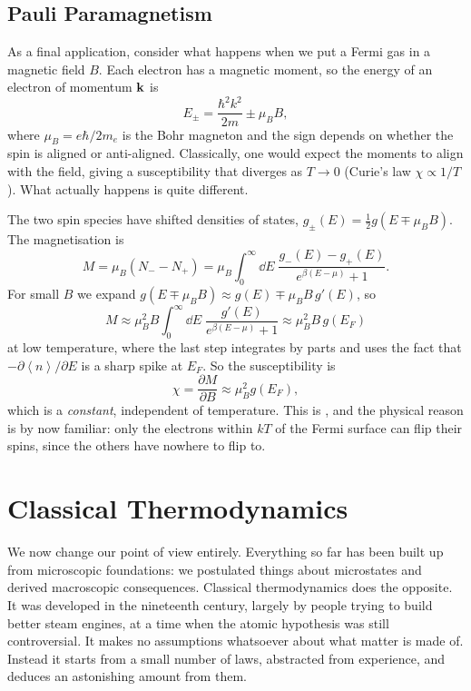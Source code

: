 \documentclass[a4paper]{scrartcl}
\newcommand{\avg}[1]{\left\langle #1 \right\rangle}
\begin{document}
\subsection{Pauli Paramagnetism}

As a final application, consider what happens when we put a Fermi gas in a magnetic field $B$. Each electron has a magnetic moment, so the energy of an electron of momentum $\mathbf{k}$ is
$$
E_\pm = \frac{\hbar^2 k^2}{2m} \pm \mu_B B,
$$
where $\mu_B = e\hbar/2m_e$ is the Bohr magneton and the sign depends on whether the spin is aligned or anti-aligned. Classically, one would expect the moments to align with the field, giving a susceptibility that diverges as $T \to 0$ (Curie's law $\chi \propto 1/T$). What actually happens is quite different.

The two spin species have shifted densities of states, $g_\pm(E) = \tfrac 12 g(E \mp \mu_B B)$. The magnetisation is
$$
M = \mu_B (N_- - N_+) = \mu_B\int_0^\infty \dd E\; \frac{g_-(E) - g_+(E)}{e^{\beta(E-\mu)}+1}.
$$
For small $B$ we expand $g(E \mp \mu_B B) \approx g(E) \mp \mu_B B\, g'(E)$, so
$$
M \approx \mu_B^2 B \int_0^\infty \dd E\; \frac{g'(E)}{e^{\beta(E-\mu)}+1} \approx \mu_B^2 B\, g(E_F)
$$
at low temperature, where the last step integrates by parts and uses the fact that $-\partial\avg n/\partial E$ is a sharp spike at $E_F$. So the susceptibility is
$$
\chi = \frac{\partial M}{\partial B} \approx \mu_B^2 g(E_F),
$$
which is a \emph{constant}, independent of temperature. This is , and the physical reason is by now familiar: only the electrons within $kT$ of the Fermi surface can flip their spins, since the others have nowhere to flip to.

\section{Classical Thermodynamics}

We now change our point of view entirely. Everything so far has been built up from microscopic foundations: we postulated things about microstates and derived macroscopic consequences. Classical thermodynamics does the opposite. It was developed in the nineteenth century, largely by people trying to build better steam engines, at a time when the atomic hypothesis was still controversial. It makes no assumptions whatsoever about what matter is made of. Instead it starts from a small number of laws, abstracted from experience, and deduces an astonishing amount from them.
\end{document}
